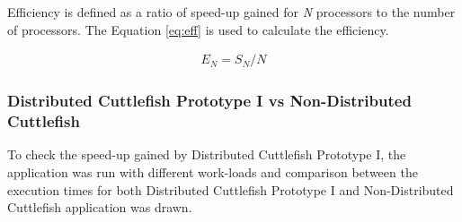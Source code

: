 Efficiency is defined as a ratio of speed-up gained for \textit{N} processors to the number of processors. The Equation \ref{eq:eff} is used to calculate the efficiency.

\begin{equation}
\label{eq:eff}
\begin{aligned}
E_{N} = S_{N}/N
\end{aligned}
\end{equation}

\subsubsection{Distributed Cuttlefish Prototype I vs Non-Distributed Cuttlefish}

To check the speed-up gained by Distributed Cuttlefish Prototype I, the application was run with different work-loads and comparison between the execution times for both Distributed Cuttlefish Prototype I and Non-Distributed Cuttlefish application was drawn.

